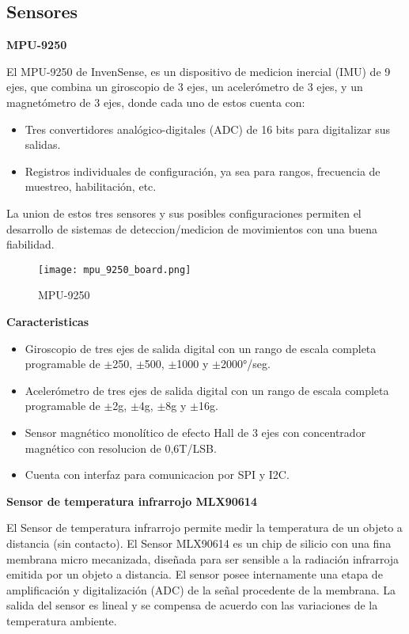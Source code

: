 \subsection{Sensores}
\textbf{MPU-9250}

El MPU-9250 de InvenSense, es un dispositivo de medicion inercial (IMU) de 9 ejes, que combina un giroscopio de 3 ejes,
un acelerómetro de 3 ejes, y un magnetómetro de 3 ejes, donde cada uno de estos cuenta con:
\begin{itemize}
    \item Tres convertidores analógico-digitales (ADC) de 16 bits para digitalizar sus salidas.
    \item Registros individuales de configuración, ya sea para rangos, frecuencia de muestreo, habilitación, etc.
\end{itemize}

La union de estos tres sensores y sus posibles configuraciones permiten el desarrollo de sistemas de deteccion/medicion de
movimientos con una buena fiabilidad.

\begin{figure}[htp]
    \centering
    \texttt{[image: mpu\_9250\_board.png]}
    \caption{MPU-9250 }
\end{figure}

\textbf{Caracteristicas}

\begin{itemize}
    \item Giroscopio de tres ejes de salida digital con un rango de escala completa programable de $ \pm $250, $ \pm $500, $ \pm $1000 y $ \pm $2000°/seg.
    \item Acelerómetro de tres ejes de salida digital con un rango de escala completa programable de $ \pm $2g, $ \pm $4g, $ \pm $8g y $ \pm $16g.
    \item Sensor magnético monolítico de efecto Hall de 3 ejes con concentrador magnético con resolucion de 0,6T/LSB.
    \item Cuenta con interfaz para comunicacion por SPI y I2C.
\end{itemize}

\textbf{Sensor de temperatura infrarrojo MLX90614}

El Sensor de temperatura infrarrojo permite medir la temperatura de un objeto a distancia (sin contacto). El Sensor MLX90614 es un chip de silicio con una fina membrana micro mecanizada, diseñada para ser sensible a la radiación infrarroja emitida por un objeto a distancia. El sensor posee internamente una etapa de amplificación y digitalización (ADC) de la señal procedente de la membrana. La salida del sensor es lineal y se compensa de acuerdo con las variaciones de la temperatura ambiente.

